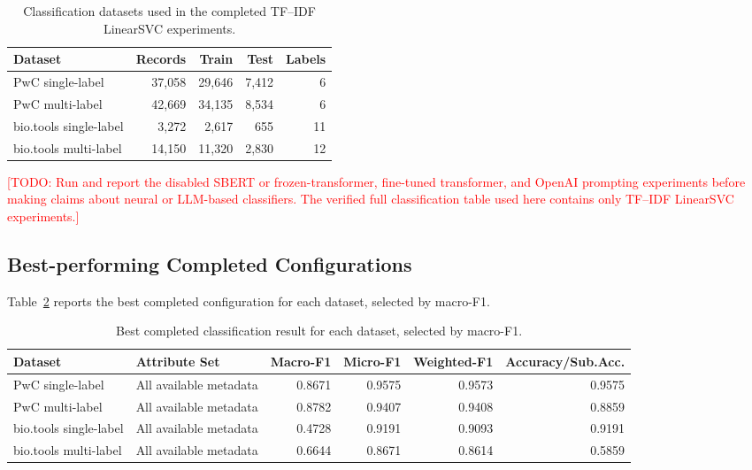 \documentclass[pdflatex,sn-mathphys-num]{sn-jnl}%
\theoremstyle{thmstyleone}%
\theoremstyle{thmstyletwo}%
\theoremstyle{thmstylethree}%
\newcommand{\TODO}[1]{\textcolor{red}{[TODO: #1]}}
\begin{document}
\begin{table}[htbp]
\centering
\small
\caption{Classification datasets used in the completed TF--IDF LinearSVC experiments.}
\label{tab:classification-datasets}
\begin{tabular}{lrrrr}
\toprule
Dataset & Records & Train & Test & Labels \\
\midrule
PwC single-label & 37,058 & 29,646 & 7,412 & 6 \\
PwC multi-label & 42,669 & 34,135 & 8,534 & 6 \\
bio.tools single-label & 3,272 & 2,617 & 655 & 11 \\
bio.tools multi-label & 14,150 & 11,320 & 2,830 & 12 \\
\bottomrule
\end{tabular}
\end{table}

\TODO{Run and report the disabled SBERT or frozen-transformer, fine-tuned transformer, and OpenAI prompting experiments before making claims about neural or LLM-based classifiers. The verified full classification table used here contains only TF--IDF LinearSVC experiments.}

\subsection{Best-performing Completed Configurations}
\label{subsec:classification-best}

Table~\ref{tab:classification-best-results} reports the best completed configuration for each dataset, selected by macro-F1.

\begin{table}[htbp]
\centering
\small
\caption{Best completed classification result for each dataset, selected by macro-F1.}
\label{tab:classification-best-results}
\begin{tabular}{llrrrr}
\toprule
Dataset & Attribute Set & Macro-F1 & Micro-F1 & Weighted-F1 & Accuracy/Sub.Acc. \\
\midrule
PwC single-label & All available metadata & 0.8671 & 0.9575 & 0.9573 & 0.9575 \\
PwC multi-label & All available metadata & 0.8782 & 0.9407 & 0.9408 & 0.8859 \\
bio.tools single-label & All available metadata & 0.4728 & 0.9191 & 0.9093 & 0.9191 \\
bio.tools multi-label & All available metadata & 0.6644 & 0.8671 & 0.8614 & 0.5859 \\
\bottomrule
\end{tabular}
\end{table}
\end{document}
